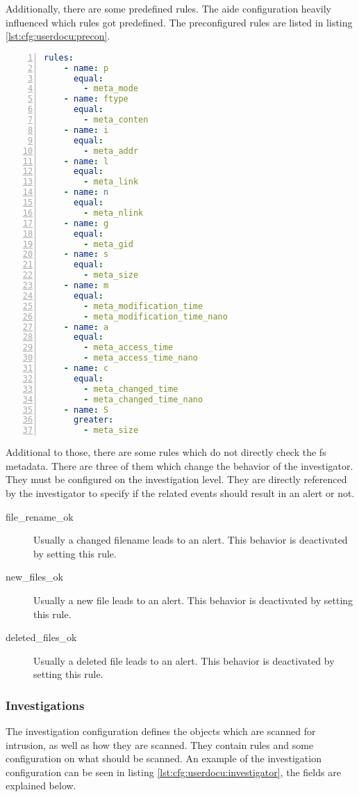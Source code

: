 Additionally, there are some predefined rules. The aide configuration heavily influenced which rules got predefined. The preconfigured rules are listed in listing \ref{lst:cfg:userdocu:precon}.

\begin{lstlisting}[language=yaml, numbers=left, caption=Preconfigured Rules, label=lst:cfg:userdocu:precon]
rules: 
	- name: p
	  equal:
		- meta_mode
	- name: ftype
	  equal:
		- meta_conten
	- name: i
	  equal:
		- meta_addr
	- name: l
	  equal:
		- meta_link
	- name: n
	  equal:
		- meta_nlink 
	- name: g
	  equal:
		- meta_gid
	- name: s
	  equal:
		- meta_size
	- name: m
	  equal:
		- meta_modification_time
		- meta_modification_time_nano
	- name: a
	  equal:
		- meta_access_time
		- meta_access_time_nano
	- name: c
	  equal:
		- meta_changed_time
		- meta_changed_time_nano
	- name: S
	  greater:
		- meta_size
\end{lstlisting}
	
Additional to those, there are some rules which do not directly check the \gls{fs} \gls{metadata}. There are three of them which change the behavior of the investigator. They must be configured on the investigation level. They are directly referenced by the investigator to specify if the related events should result in an alert or not. 

\begin{description}
    \item [file\_rename\_ok]    Usually a changed filename leads to an alert. This behavior is deactivated by setting this rule.
    \item [new\_files\_ok]    Usually a new file leads to an alert. This behavior is deactivated by setting this rule.
    \item [deleted\_files\_ok]    Usually a deleted file leads to an alert. This behavior is deactivated by setting this rule.
\end{description}

\subsubsection{Investigations}
\label{sec:config:userdocu:investigations}

The investigation configuration defines the objects which are scanned for intrusion, as well as how they are scanned. They contain rules and some configuration on what should be scanned. An example of the investigation configuration can be seen in listing \ref{lst:cfg:userdocu:investigator}, the fields are explained below.


